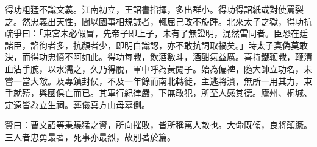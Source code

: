 \begin{pinyinscope}
得功粗猛不識文義。江南初立，王詔書指揮，多出群小。得功得詔紙或對使罵裂之。然忠義出天性，聞以國事相規誡者，輒屈己改不旋踵。北來太子之獄，得功抗疏爭曰：「東宮未必假冒，先帝子即上子，未有了無證明，混然雷同者。臣恐在廷諸臣，諂徇者多，抗顏者少，即明白識認，亦不敢抗詞取禍矣。」時太子真偽莫敢決，而得功忠憤不阿如此。得功每戰，飲酒數斗，酒酣氣益厲。喜持鐵鞭戰，鞭漬血沾手腕，以水濡之，久乃得脫，軍中呼為黃闖子。始為偏裨，隨大帥立功名，未嘗一當大敵。及專鎮封侯，不及一年餘而南北轉徙，主逃將潰，無所一用其力，束手就殪，與國俱亡而已。其軍行紀律嚴，下無敢犯，所至人感其德。廬州、桐城、定遠皆為立生祠。葬儀真方山母墓側。

贊曰：曹文詔等秉驍猛之資，所向摧敗，皆所稱萬人敵也。大命既傾，良將顛蹶。三人者忠勇最著，死事亦最烈，故別著於篇。


\end{pinyinscope}